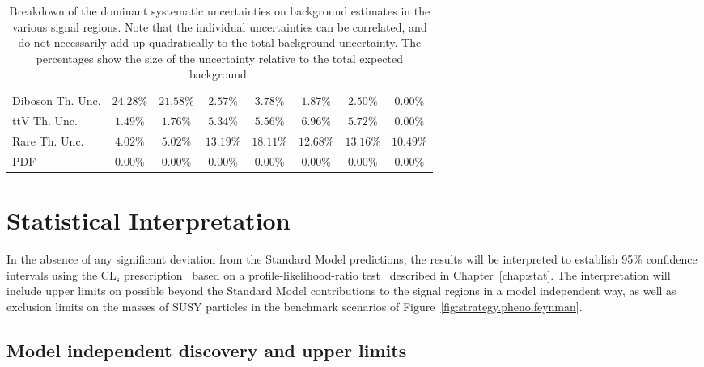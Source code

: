 \begin{table}
\begin{center}
{\begin{tabular}{|l|c|c|c|c|c|c|c|}
        \hline
        Diboson Th. Unc.    &    $24.28 \%$    &   $21.58 \%$    &    $2.57 \%$    &    $3.78 \%$    &    $1.87 \%$    &    $2.50 \%$       &    $0.00 \%$     \\
        ttV Th. Unc.    &    $1.49 \%$    &   $1.76 \%$    &    $5.34 \%$    &    $5.56 \%$    &    $6.96 \%$    &    $5.72 \%$       &    $0.00 \%$     \\
        Rare Th. Unc.    &    $4.02 \%$    &   $5.02 \%$    &    $13.19 \%$    &    $18.11 \%$    &    $12.68 \%$    &    $13.16 \%$       &    $10.49 \%$     \\
        PDF    &    $0.00 \%$    &   $0.00 \%$    &    $0.00 \%$    &    $0.00 \%$    &    $0.00 \%$    &    $0.00 \%$       &    $0.00 \%$     \\
\hline 
\end{tabular}}

\vspace*{1cm}

\vspace*{-0.01\textheight}\caption{Breakdown of the dominant systematic uncertainties on background estimates in the various signal regions.
Note that the individual uncertainties can be correlated, and do not necessarily add up quadratically to 
the total background uncertainty. The percentages show the size of the uncertainty relative to the total expected background.}
\label{tab:res.sys.break}
\end{center}
\end{table}




\section{Statistical Interpretation}

In the absence of any significant deviation from the Standard Model predictions,
the results will be interpreted to 
 establish 95\% confidence intervals using the CL$_\mathrm{s}$ prescription~\cite{Read:2002hq} 
based on a profile-likelihood-ratio test~\cite{Cowan:2010js}
 described in Chapter~\ref{chap:stat}.
The interpretation will include upper limits on possible beyond the Standard Model contributions to the signal 
regions in a model independent way,
as well as exclusion limits on the masses of 
SUSY particles in the benchmark scenarios of Figure~\ref{fig:strategy.pheno.feynman}. 

\subsection{Model independent discovery and upper limits}

